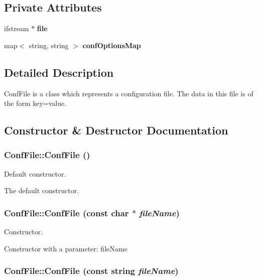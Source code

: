 \subsection*{Private Attributes}
\begin{CompactItemize}
\item 
ifstream $\ast$ {\bf file}\label{classConfFile_r0}

\item 
map$<$ string, string $>$ {\bf conf\-Options\-Map}\label{classConfFile_r1}

\end{CompactItemize}


\subsection{Detailed Description}
Conf\-File is a class which represents a configuration file. The data in this file is of the form key=value. 



\subsection{Constructor \& Destructor Documentation}
\subsubsection{\setlength{\rightskip}{0pt plus 5cm}Conf\-File::Conf\-File ()}\label{classConfFile_a0}


Default constructor. 

The default constructor. 
\subsubsection{\setlength{\rightskip}{0pt plus 5cm}Conf\-File::Conf\-File (const char $\ast$ {\em file\-Name})}\label{classConfFile_a1}


Constructor. 

Constructor with a parameter: file\-Name 
\subsubsection{\setlength{\rightskip}{0pt plus 5cm}Conf\-File::Conf\-File (const string {\em file\-Name})}\label{classConfFile_a2}


